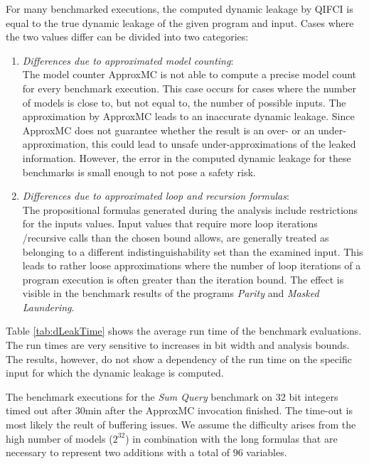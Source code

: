 For many benchmarked executions, the computed dynamic leakage by QIFCI is equal to the true dynamic leakage of the given program and input. Cases where the two values differ can be divided into two categories:

\begin{enumerate}
    \item \emph{Differences due to approximated model counting}:\\The model counter ApproxMC is not able to compute a precise model count for every benchmark execution. This case occurs for cases where the number of models is close to, but not equal to, the number of possible inputs. The approximation by ApproxMC leads to an inaccurate dynamic leakage. Since ApproxMC does not guarantee whether the result is an over- or an under-approximation, this could lead to unsafe under-approximations of the leaked information. However, the error in the computed dynamic leakage for these benchmarks is small enough to not pose a safety risk.
    \item \emph{Differences due to approximated loop and recursion formulas}:\\The propositional formulas generated during the analysis include restrictions for the inputs values. Input values that require more loop iterations /recursive calls than the chosen bound allows, are generally treated as belonging to a different indistinguishability set than the examined input. This leads to rather loose approximations where the number of loop iterations of a program execution is often greater than the iteration bound. The effect is visible in the benchmark results of the programs \emph{Parity} and \emph{Masked Laundering}.
\end{enumerate}

Table \ref{tab:dLeakTime} shows the average run time of the benchmark evaluations. The run times are very sensitive to increases in bit width and analysis bounds. The results, however, do not show a dependency of the run time on the specific input for which the dynamic leakage is computed.

The benchmark executions for the \emph{Sum Query} benchmark on 32 bit integers timed out after 30min after the ApproxMC invocation finished. The time-out is most likely the reult of buffering issues. We assume the difficulty arises from the high number of models ($2^{32}$) in combination with the long formulas that are necessary to represent two additions with a total of $96$ variables.


